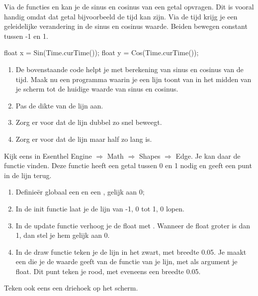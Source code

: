 \begin{exercise}
Via de functies  en  kan je de sinus en cosinus van een getal opvragen. Dit is vooral handig omdat dat getal bijvoorbeeld de tijd kan zijn. Via de tijd krijg je een geleidelijke verandering in de sinus en cosinus waarde. Beiden bewegen constant tussen -1 en 1. 

\begin{code}
float x = Sin(Time.curTime());
float y = Cos(Time.curTime());
\end{code}

\begin{enumerate}
\item De bovenstaande code helpt je met berekening van sinus en cosinus van de tijd. Maak nu een programma waarin je een lijn toont van in het midden van je scherm tot de huidige waarde van sinus en cosinus.
\item Pas de dikte van de lijn aan.
\item Zorg er voor dat de lijn dubbel zo snel beweegt.
\item Zorg er voor dat de lijn maar half zo lang is.
\end{enumerate}
\end{exercise}

\begin{exercise}
Kijk eens in Esenthel Engine $\Rightarrow$ Math $\Rightarrow$ Shapes $\Rightarrow$ Edge. Je kan daar de functie  vinden. Deze functie heeft een getal tussen 0 en 1 nodig en geeft een punt in de lijn terug.

\begin{enumerate}
\item Definie\"er globaal een  en een , gelijk aan 0;
\item In de init functie laat je de lijn van -1, 0 tot 1, 0 lopen.
\item In de update functie verhoog je de float met . Wanneer de float groter is dan 1, dan stel je hem gelijk aan 0.
\item In de draw functie teken je de lijn in het zwart, met breedte 0.05. Je maakt een  die je de waarde geeft van de  functie van je lijn, met als argument je float. Dit punt teken je rood, met eveneens een breedte 0.05.
\end{enumerate}
\end{exercise}

\begin{exercise}
Teken ook eens een driehoek op het scherm.
\end{exercise}

